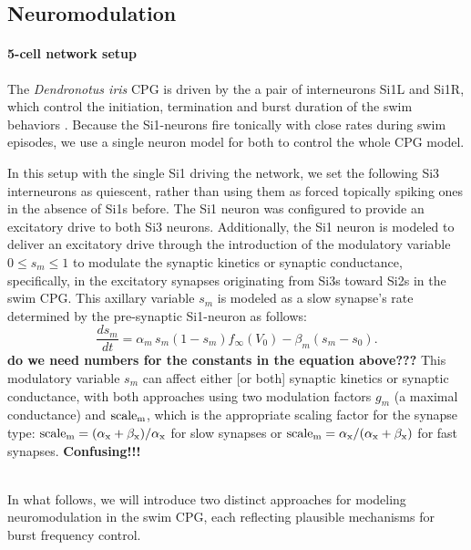 \documentclass[nofootinbib,aip,amsmath,amssymb,reprint,twocolumn,10pt]{revtex4-2}
\begin{document}
\subsection{Neuromodulation}
\paragraph{5-cell network setup}

The {\em Dendronotus iris} CPG is driven by the a pair of interneurons Si1L and Si1R, which control the initiation, termination and burst duration of the swim behaviors \cite{sakurai2019command, SakuraiKatz2016}. Because the Si1-neurons fire tonically with close rates during swim episodes, we use a single neuron model for both to control the whole CPG model.

In this setup with the single Si1 driving the network, we set the following Si3 interneurons as quiescent, rather than using them as forced topically spiking ones in the absence of Si1s before. The Si1 neuron was configured to provide an excitatory drive to both Si3 neurons. Additionally, the Si1 neuron is modeled to deliver an excitatory drive through  the introduction of the modulatory variable $0 \le s_m \le 1$ to modulate the synaptic kinetics or synaptic conductance, specifically, in the excitatory synapses originating from Si3s toward Si2s in the swim CPG. This axillary variable $s_m$ is modeled as a slow synapse's rate determined by the pre-synaptic Si1-neuron as follows:
%
\begin{equation}
\frac{ds_m}{dt} = \alpha_m\, s_m (1 - s_m) f_{\infty}(V_0) - \beta_m (s_m - s_0).
\end{equation}
{\bf do we need numbers for the constants in the equation above???}
%
This modulatory variable  $s_m$ can affect either [or both] synaptic kinetics or synaptic conductance, with both approaches using two modulation factors $g_m$ (a maximal conductance) and $\rm scale_m$, which is the appropriate scaling factor for the synapse type: $\rm scale_m = (\alpha_x + \beta_x)/\alpha_x$ for slow synapses or $\rm scale_m = \alpha_x/(\alpha_x + \beta_x)$ for fast synapses. {\bf Confusing!!! }

~\\
In what follows, we will introduce two distinct approaches for modeling neuromodulation in the swim CPG, each reflecting plausible mechanisms for burst frequency control.
\end{document}
